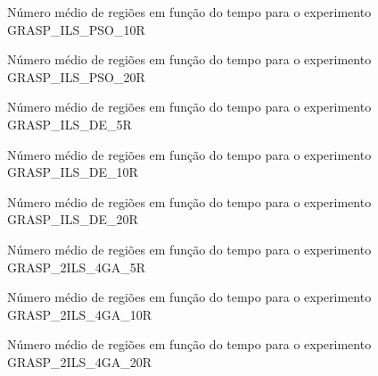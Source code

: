 \begin{apendicesenv}
\begin{figure}
    \centering
    \caption{Número médio de regiões em função do tempo para o experimento GRASP\_ILS\_PSO\_10R}
    
\end{figure}

\begin{figure}
    \centering
    \caption{Número médio de regiões em função do tempo para o experimento GRASP\_ILS\_PSO\_20R}
    
\end{figure}

\begin{figure}
    \centering
    \caption{Número médio de regiões em função do tempo para o experimento GRASP\_ILS\_DE\_5R}
    
\end{figure}

\begin{figure}
    \centering
    \caption{Número médio de regiões em função do tempo para o experimento GRASP\_ILS\_DE\_10R}
    
\end{figure}

\begin{figure}
    \centering
    \caption{Número médio de regiões em função do tempo para o experimento GRASP\_ILS\_DE\_20R}
    
\end{figure}

\begin{figure}
    \centering
    \caption{Número médio de regiões em função do tempo para o experimento GRASP\_2ILS\_4GA\_5R}
    
\end{figure}

\begin{figure}
    \centering
    \caption{Número médio de regiões em função do tempo para o experimento GRASP\_2ILS\_4GA\_10R}
    
\end{figure}

\begin{figure}
    \centering
    \caption{Número médio de regiões em função do tempo para o experimento GRASP\_2ILS\_4GA\_20R}
    
\end{figure}


\end{apendicesenv}
